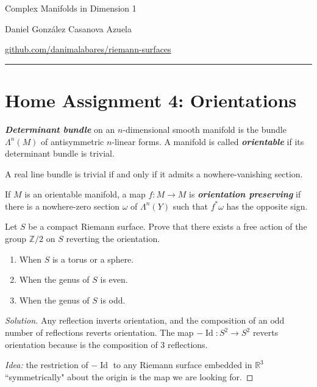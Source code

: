 \documentclass{article}
\newcommand{\R}{\mathbb{R}}
\newcommand{\Z}{\mathbb{Z}}
\DeclareMathOperator{\Id}{Id}
\begin{document}
\begin{minipage}{\textwidth}
	\begin{minipage}{.5\textwidth}
		Complex Manifolds in Dimension 1\\
	\end{minipage}%
	\begin{minipage}{.5\textwidth}
		\raggedleft
		Daniel González Casanova Azuela\par
		{\small\href{https://github.com/danimalabares/riemann-surfaces}{github.com/danimalabares/riemann-surfaces}}
	\end{minipage}%
\end{minipage}\vspace{.2cm}\hrule
\section{Home Assignment 4: Orientations}
\setcounter{section}{4}
\begin{defn}
	\textbf{\textit{Determinant bundle}} on an $n$-dimensional smooth manifold is the bundle $\Lambda^n(M)$ of antisymmetric $n$-linear forms. A manifold is called \textbf{\textit{orientable}} if its determinant bundle is trivial.
\end{defn}

\begin{remark}
	A real line bundle is trivial if and only if it admits a nowhere-vanishing section.
\end{remark}

\begin{defn}
	If $M$ is an orientable manifold, a map $f:M\to M$ is \textbf{\textit{orientation preserving}} if there is a nowhere-zero section $\omega$ of $\Lambda^n(Y)$ such that $f^*\omega$ has the opposite sign.
\end{defn}

\begin{exercise}
	Let $S$ be a compact Riemann surface. Prove that there exists a free action of the group $\Z/2$ on $S$ reverting the orientation.
	\begin{enumerate}[label=\alph*.]
		\item When $S$ is a torus or a sphere. 
		\item When the genus of $S$ is even.
		\item When the genus of $S$ is odd.
	\end{enumerate}
\end{exercise}
\begin{proof}[Solution]\leavevmode
		Any reflection inverts orientation, and the composition of an odd number of reflections reverts orientation. The map $-\Id:S^2\to S^2$ reverts orientation because is the composition of 3 reflections.
		
		\textit{Idea:} the restriction of $-\Id$ to any Riemann surface embedded in $\R^3$ ``symmetrically" about the origin is the map we are looking for.
\end{proof}
\end{document}
